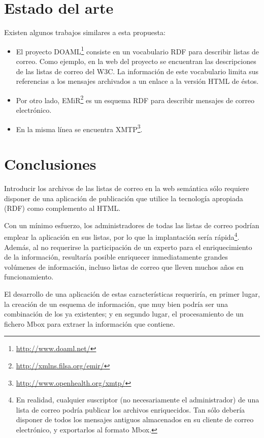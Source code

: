 \section*{Estado del arte}

Existen algunos trabajos similares a esta propuesta:

\begin{itemize}
  \item El proyecto DOAML\footnote{\url{http://www.doaml.net/}} consiste en un 
	vocabulario RDF para describir listas de correo. Como ejemplo, en 
	la web del proyecto se encuentran las descripciones de las listas 
	de correo del W3C. La información de este vocabulario limita sus 
	referencias a los mensajes archivados a un enlace a la versión HTML 
	de éstos.
  \item Por otro lado, EMiR\footnote{\url{http://xmlns.filsa.org/emir/}} es un 
	esquema RDF para describir mensajes de correo electrónico. 
  \item En la misma línea se encuentra XMTP\footnote{\url{http://www.openhealth.org/xmtp/}}.
\end{itemize}

\section*{Conclusiones}

Introducir los archivos de las listas de correo en la web semántica sólo
requiere disponer de una aplicación de publicación que utilice la tecnología
apropiada (RDF) como complemento al HTML.

Con un mínimo esfuerzo, los administradores de todas las listas de correo
podrían emplear la aplicación en sus listas, por lo que la implantación
sería rápida\footnote{En realidad, cualquier suscriptor (no necesariamente 
el administrador) de una lista de correo podría publicar los archivos enriquecidos.
Tan sólo debería disponer de todos los mensajes antiguos almacenados en su 
cliente de correo electrónico, y exportarlos al formato Mbox.}. Además, al 
no requerirse la participación de un experto para el enriquecimiento de la 
información, resultaría posible enriquecer inmediatamente grandes volúmenes 
de información, incluso listas de correo que lleven muchos años en funcionamiento.

El desarrollo de una aplicación de estas características requeriría, en
primer lugar, la creación de un esquema de información, que muy bien podría
ser una combinación de los ya existentes; y en segundo lugar, el procesamiento 
de un fichero Mbox para extraer la información que contiene.
